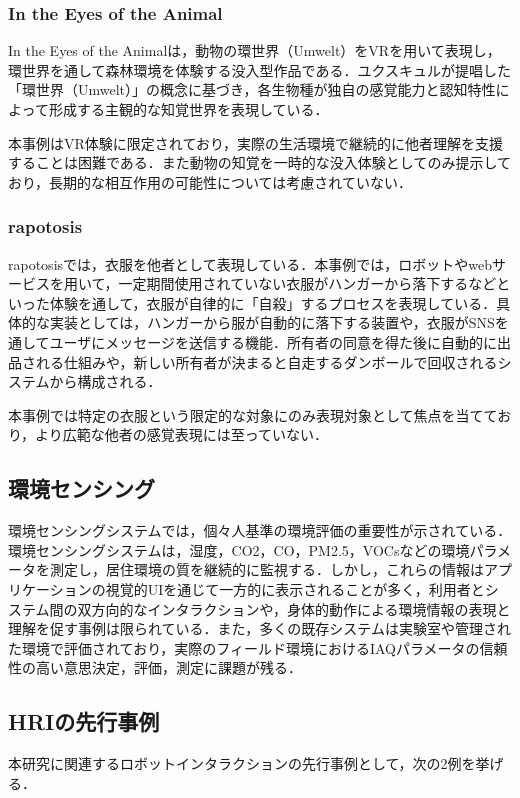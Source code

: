 \documentclass{cuxarticle}
\begin{document}
\subsubsection{In the Eyes of the Animal}
In the Eyes of the Animal\cite{--EyesAnimal}は，動物の環世界（Umwelt）をVRを用いて表現し，環世界を通して森林環境を体験する没入型作品である．ユクスキュルが提唱した「環世界（Umwelt）」の概念に基づき，各生物種が独自の感覚能力と認知特性によって形成する主観的な知覚世界を表現している．

本事例はVR体験に限定されており，実際の生活環境で継続的に他者理解を支援することは困難である．また動物の知覚を一時的な没入体験としてのみ提示しており，長期的な相互作用の可能性については考慮されていない．

\subsubsection{rapotosis}
rapotosis\cite{--ソンヨン}では，衣服を他者として表現している．本事例では，ロボットやwebサービスを用いて，一定期間使用されていない衣服がハンガーから落下するなどといった体験を通して，衣服が自律的に「自殺」するプロセスを表現している．具体的な実装としては，ハンガーから服が自動的に落下する装置や，衣服がSNSを通してユーザにメッセージを送信する機能．所有者の同意を得た後に自動的に出品される仕組みや，新しい所有者が決まると自走するダンボールで回収されるシステムから構成される．

本事例では特定の衣服という限定的な対象にのみ表現対象として焦点を当てており，より広範な他者の感覚表現には至っていない．

\subsection{環境センシング}
環境センシングシステムでは，個々人基準の環境評価の重要性が示されている\cite{Saini-2020-IndoorAirQualityMonitoring}．環境センシングシステムは，湿度，CO2，CO，PM2.5，VOCsなどの環境パラメータを測定し，居住環境の質を継続的に監視する．しかし，これらの情報はアプリケーションの視覚的UIを通じて一方的に表示されることが多く，利用者とシステム間の双方向的なインタラクションや，身体的動作による環境情報の表現と理解を促す事例は限られている．また，多くの既存システムは実験室や管理された環境で評価されており，実際のフィールド環境におけるIAQパラメータの信頼性の高い意思決定，評価，測定に課題が残る．

\subsection{HRIの先行事例}
本研究に関連するロボットインタラクションの先行事例として，次の2例を挙げる．
\end{document}
